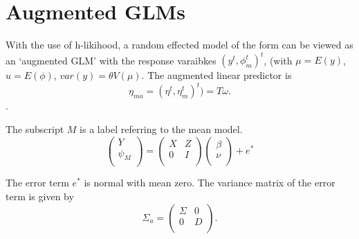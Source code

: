 \documentclass[Chap5dmain.tex]{subfiles}
\begin{document}



\section{Augmented GLMs} %

With the use of h-likihood, a random effected model of the form can be viewed as an `augmented GLM' with the response varaibkes $(y^t, \phi^t_m)^t$, (with $\mu = E(y)$,$ u = E(\phi)$, $var(y) = \theta V (\mu)$.
The augmented linear predictor is \[\eta_{ma}  = (\eta^t, \eta^t_m)^t) = T\omega. \].



The subscript $M$ is a label referring to the mean model.
\begin{equation}
\left(%
\begin{array}{c}
  Y \\
  \psi_{M} \\
\end{array}%
\right) = \left(
\begin{array}{cc}
  X & Z \\
  0 & I \\
\end{array}\right) \left(%
\begin{array}{c}
  \beta \\
  \nu \\
\end{array}%
\right)+ e^{*}
\end{equation}




The error term $e^{*}$ is normal with mean zero. The variance matrix of the error term is given by
\begin{equation}
\Sigma_{a} = \left(%
\begin{array}{cc}
  \Sigma & 0 \\
  0 & D \\
\end{array}%
\right).
\end{equation}
\end{document}
